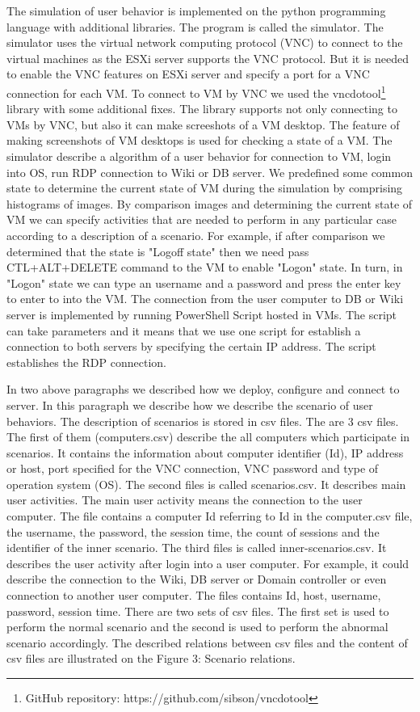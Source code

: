 The simulation of user behavior is implemented on the python programming language with additional libraries. The program is called the simulator. The simulator uses the virtual network computing protocol (VNC) to connect to the virtual machines as the ESXi server supports the VNC protocol. But it is needed to enable the VNC features on ESXi server and specify a port for a VNC connection for each VM. To connect to VM by VNC we used the vncdotool\footnote{GitHub repository: https://github.com/sibson/vncdotool} library with some additional fixes. The library supports not only connecting to VMs by VNC, but also it can make screeshots of a VM desktop. The feature of making screenshots of VM desktops is used for checking a state of a VM. The simulator describe a algorithm of a user behavior for connection to VM, login into OS, run RDP connection to Wiki or DB server. We predefined some common state to determine the current state of VM during the simulation by comprising histograms of images. By comparison images and determining the current state of VM we can specify activities that are needed to perform in any particular case according to a description of a scenario. For example, if after comparison we determined that the state is "Logoff state" then we need pass CTL+ALT+DELETE command to the VM to enable "Logon" state. In turn, in "Logon" state we can type an username and a password and press the enter key to enter to into the VM. The connection from the user computer to DB or Wiki server is implemented by running PowerShell Script hosted in VMs. The script can take parameters and it means that we use one script for establish a connection to both servers by specifying the certain IP address. The script establishes the RDP connection. 

In two above paragraphs we described how we deploy, configure and connect to server. In this paragraph we describe how we describe the scenario of user behaviors. The description of scenarios is stored in csv files. The are 3 csv files. The first of them (computers.csv) describe the all computers which participate in scenarios. It contains the information about computer identifier (Id), IP address or host, port specified for the VNC connection, VNC password and type of operation system (OS).
The second files is called scenarios.csv. It describes main user activities. The main user activity means the connection to the user computer. The file contains a computer Id referring to Id in the computer.csv file, the username, the password, the session time, the count of sessions and the identifier of the inner scenario. The third files is called inner-scenarios.csv. It describes the user activity after login into a user computer. For example, it could describe the connection to the Wiki, DB server or Domain controller or even connection to another user computer. The files contains Id, host, username, password, session time. There are two sets of csv files. The first set is used to perform the normal scenario and the second is used to perform the abnormal scenario accordingly. The described relations between csv files and the content of csv files are illustrated on the Figure 3: Scenario relations.
 	
